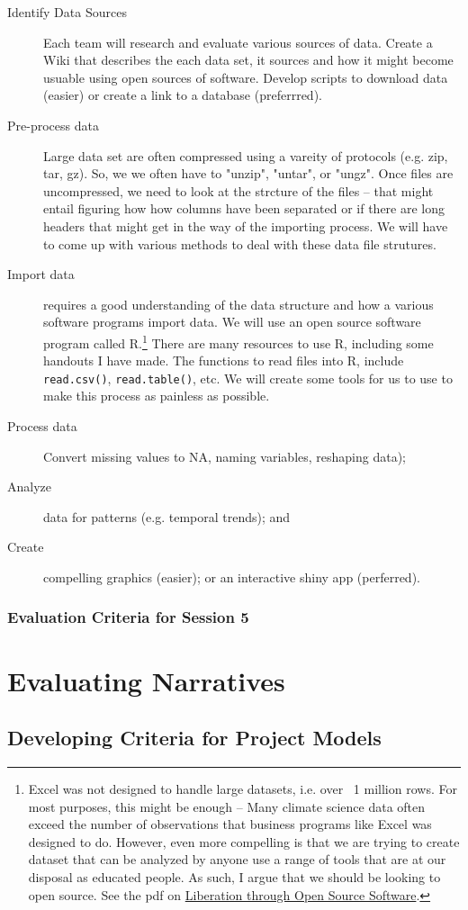 \documentclass{article}\usepackage[]{graphicx}\usepackage[]{color}
\begin{document}
\begin{description}
  \item[Identify Data Sources] Each team will research and evaluate various sources of data. Create a Wiki that describes the each data set, it sources and how it might become usuable using open sources of software. Develop scripts to download data (easier) or create a link to a database (preferrred). 
  \item[Pre-process data] Large data set are often compressed using a vareity of protocols (e.g. zip, tar, gz). So, we we often have to "unzip", "untar", or "ungz". Once files are uncompressed, we need to look at the strcture of the files -- that might entail figuring how how columns have been separated or if there are long headers that might get in the way of the importing process. We will have to come up with various methods to deal with these data file strutures. 
  \item[Import data] requires a good understanding of the data structure and how a various software programs import data. We will use an open source software program called R.\footnote{Excel was not designed to handle large datasets, i.e. over ~1 million rows. For most purposes, this might be enough -- Many climate science data often exceed the number of observations that business programs like Excel was designed to do. However, even more compelling is that we are trying to create dataset that can be analyzed by anyone use a range of tools that are at our disposal as educated people. As such, I argue that we should be looking to open source. See the pdf on \href{https://rstudio.campus.pomona.edu/s/c2d027b9f6ba35ba4d250/files/github/Climate_Change_Narratives/Data/Liberation_via_Open_Source_Software.pdf}{Liberation through Open Source Software}.} There are many resources to use R, including some handouts I have made. The functions to read files into R, include \texttt{read.csv()}, \texttt{read.table()}, etc. We will create some tools for us to use to make this process as painless as possible. 
  \item[Process data] Convert missing values to NA, naming variables, reshaping data);
  \item[Analyze] data for patterns (e.g. temporal trends); and
  \item[Create] compelling graphics (easier); or an interactive shiny app (perferred).
\end{description}



\subsubsection{Evaluation Criteria for Session 5}


\section{Evaluating Narratives}

\subsection{Developing Criteria for Project Models}
\end{document}
